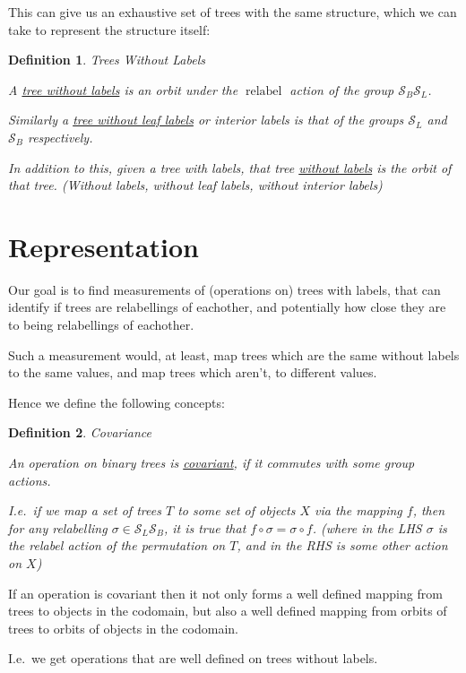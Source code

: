 \documentclass[10pt,a4paper]{report}
\DeclareMathOperator{\relabel}{relabel}
\newcommand{\Sym}{\mathcal{S}}
\newtheorem{definition}{Definition}
\begin{document}
This can give us an exhaustive set of trees with the same structure, which we
can take to represent the structure itself:

\begin{definition} Trees Without Labels

	A \underline{tree without labels} is an orbit under the $\relabel$ action
	of the group ${\Sym_B}{\Sym_L}$.

	Similarly a \underline{tree without leaf labels} or interior labels is that
	of the groups $\Sym_L$ and $\Sym_B$ respectively.

	In addition to this, given a tree with labels, \emph{that} tree
	\underline{without labels} is the orbit of that tree. (Without labels,
	without leaf labels, without interior labels)
\end{definition}

\section{Representation}

Our goal is to find measurements of (operations on) trees with labels, that can
identify if trees are relabellings of eachother, and potentially how close they
are to being relabellings of eachother.

Such a measurement would, at least, map trees which are the same without labels
to the same values, and map trees which aren't, to different values.

Hence we define the following concepts:

\begin{definition} Covariance

	An operation on binary trees is \underline{covariant}, if it commutes with
	some group actions.

	I.e.\ if we map a set of trees $T$ to some set of objects $X$ via the
	mapping $f$, then for any relabelling $\sigma \in \Sym_L\Sym_B$, it is
	true that $f \circ \sigma = \sigma \circ f$. (where in the LHS $\sigma$ is
	the relabel action of the permutation on $T$, and in the RHS is some other
	action on $X$)
\end{definition}

If an operation is covariant then it not only forms a well defined mapping from
trees to objects in the codomain, but also a well defined mapping from orbits
of trees to orbits of objects in the codomain.

I.e.\ we get operations that are well defined on trees without labels.
\end{document}
